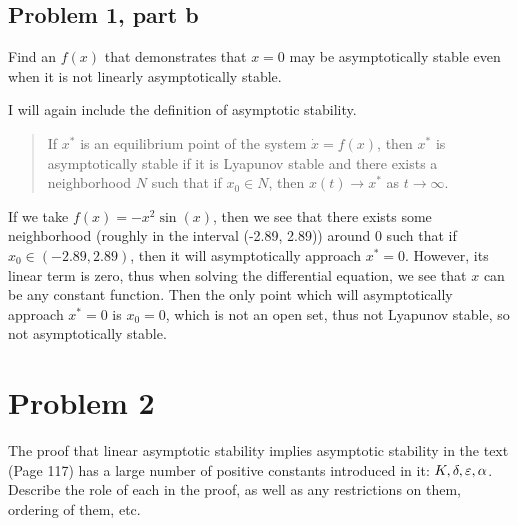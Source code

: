 \newpage
\subsection{Problem 1, part b}
Find an $f(x)$ that demonstrates that $x = 0$ may be asymptotically stable even when it is not linearly asymptotically stable.
\partbreak
\begin{solution}

    I will again include the definition of asymptotic stability.

    \alignbreak
    \vspace{-8mm}
    \begin{quote}
        If $x^*$ is an equilibrium point of the system $\dot{x} = f(x)$, then $x^*$ is asymptotically stable if it is Lyapunov stable and there exists a neighborhood $N$ such that if $x_0 \in N$, then $x(t) \rightarrow x^*$ as $t \rightarrow \infty$. 
    \end{quote}
    \vspace{-8mm}
    \alignbreak

    If we take $f(x) = -x^2\sin(x)$, then we see that there exists some neighborhood (roughly in the interval (-2.89, 2.89)) around 0 such that if $x_0 \in (-2.89, 2.89)$, then it will asymptotically approach $x^* = 0$. However, its linear term is zero, thus when solving the differential equation, we see that $x$ can be any constant function. Then the only point which will asymptotically approach $x^* = 0$ is $x_0 = 0$, which is not an open set, thus not Lyapunov stable, so not asymptotically stable. 
\end{solution} 

\newpage
\section{Problem 2}
The proof that linear asymptotic stability implies asymptotic stability in the text (Page 117) has a large number of positive constants introduced in it: $K, \delta, \varepsilon, \alpha$. Describe the role of each in the proof, as well as any restrictions on them, ordering of them, etc. 

